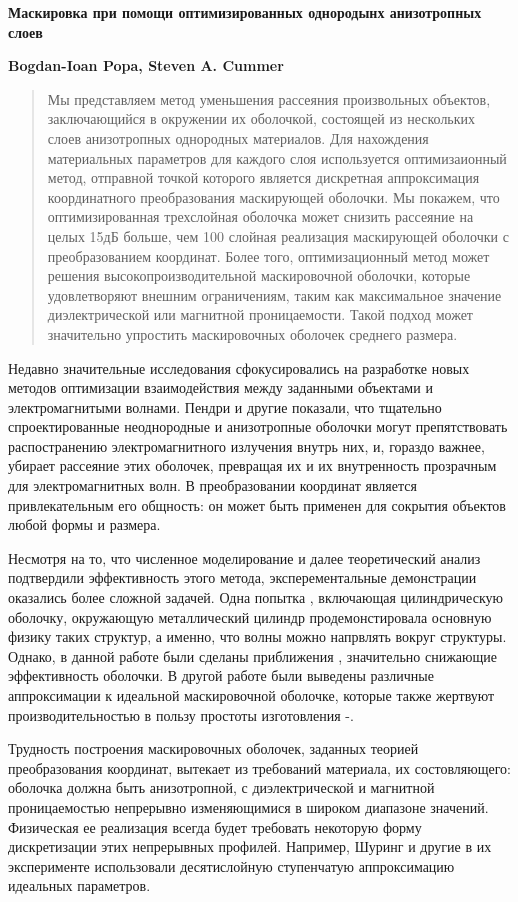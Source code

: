 \documentclass[a4paper, 12pt]{article}
\newcommand{\tit}[1]{\begin{center}{\bf{\Large #1}}\end{center}}
\newcommand{\aut}[1]{\centerline{{\bf #1}}}
\begin{document}
\sloppy
 \tit{Маскировка при помощи оптимизированных однородынх анизотропных слоев}
 \aut{Bogdan-Ioan Popa, Steven A. Cummer}

\begin{abstract}
Мы представляем метод уменьшения рассеяния произвольных объектов, заключающийся
в окружении их оболочкой, состоящей из нескольких слоев анизотропных однородных 
материалов. Для нахождения материальных параметров для каждого слоя используется
оптимизаионный метод, отправной точкой которого является дискретная аппроксимация
координатного преобразования маскирующей оболочки. Мы покажем, что оптимизированная
трехслойная оболочка может снизить рассеяние на целых 15дБ больше, чем 100 слойная
реализация маскирующей оболочки с преобразованием координат. Более того,
оптимизационный метод может решения высокопроизводительной маскировочной оболочки,
которые удовлетворяют внешним ограничениям, таким как максимальное значение
диэлектрической или магнитной проницаемости. Такой подход может значительно
упростить маскировочных оболочек среднего размера. 
\end{abstract}

Недавно значительные исследования сфокусировались на разработке новых
методов оптимизации взаимодействия между заданными объектами и электромагнитыми
волнами. Пендри и другие \cite{1} показали, что тщательно спроектированные
неоднородные и анизотропные оболочки могут препятствовать распостранению
электромагнитного излучения внутрь них, и, гораздо важнее, убирает рассеяние
этих оболочек, превращая их и их внутренность прозрачным для электромагнитных волн.
В преобразовании координат является привлекательным его общность: 
он может быть применен для сокрытия объектов любой формы и размера.

Несмотря на то, что численное моделирование \cite{2} и далее теоретический анализ
\cite{3} подтвердили эффективность этого метода, эксперементальные демонстрации
оказались более сложной задачей. Одна попытка \cite{4}, включающая цилиндрическую
оболочку, окружающую металлический цилиндр продемонстировала основную физику
таких структур, а именно, что волны можно напрвлять вокруг структуры. Однако,
в данной работе были сделаны приближения \cite{2}, значительно снижающие
эффективность оболочки. В другой работе были выведены различные аппроксимации
к идеальной маскировочной оболочке, которые также жертвуют производительностью
в пользу простоты изготовления \cite{5}-\cite{7}.

Трудность построения маскировочных оболочек, заданных теорией преобразования
координат, вытекает из требований материала, их состовляющего: оболочка должна
быть анизотропной, с диэлектрической и магнитной проницаемостью непрерывно
изменяющимися в широком диапазоне значений. Физическая ее реализация 
всегда будет требовать некоторую форму дискретизации этих непрерывных профилей.
Например, Шуринг и другие \cite{4} в их эксперименте использовали десятислойную 
ступенчатую аппроксимацию идеальных параметров.
\end{document}

